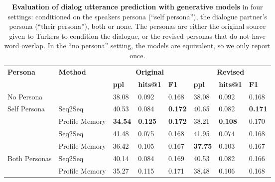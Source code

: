 \documentclass[11pt,a4paper]{article}
\begin{document}
\begin{table*}[t]
  \centering
  \begin{tabular}{llllllll}
  \toprule
  \multirow{2}{*}{\textbf{Persona}} & \multirow{2}{*}{\textbf{Method}} & \multicolumn{3}{c}{\textbf{Original}} & \multicolumn{3}{c}{\textbf{Revised}}\\
  & & \textbf{ppl} & \textbf{hits@1} & \textbf{F1}&\textbf{ppl} & \textbf{hits@1} & \textbf{F1}\\
  \midrule
  No Persona & & 38.08 & 0.092 & 0.168&38.08 & 0.092&0.168\\\midrule
  \multirow{3}{*}{Self Persona} & Seq2Seq & 40.53 & 0.084 &\textbf{0.172}& 40.65  & 0.082&\textbf{0.171}\\
   & Profile Memory & \textbf{34.54} & \textbf{0.125} &\textbf{0.172}& 38.21 & \textbf{0.108}&0.170\\\midrule
  \multirow{3}{*}{Their Persona} & Seq2Seq & 41.48 & 0.075 &0.168& 41.95 & 0.074&0.168\\
   & Profile Memory & 36.42 & 0.105 &0.167& \textbf{37.75} & 0.103&0.167\\\midrule
  \multirow{3}{*}{Both Personas} & Seq2Seq & 40.14 & 0.084 &0.169& 40.53 & 0.082&0.166\\
   & Profile Memory & 35.27 & 0.115 &0.171& 38.48 & 0.106&0.168\\ 
  \bottomrule
  \end{tabular}
  \caption{{\bf Evaluation of dialog utterance prediction with generative models} in four settings: conditioned on the speakers persona (``self persona''), the dialogue partner's persona (``their persona''), both or none. The personas are either the original source given to Turkers to condition the dialogue, or the revised personas that do not have word overlap. In the ``no persona'' setting, the models are equivalent, so we only report once.
     \label{tab:generative-results}
     }
\end{table*}
\end{document}
